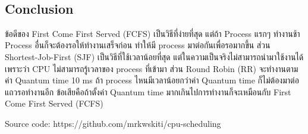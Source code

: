 \documentclass[12pt]{article}
\begin{document}
    \begin{center}
    \end{center}
    { \hspace*{\fill} \\}
    
    \subsection{Conclusion}\label{conclusion}

ข้อดีของ First Come First Served (FCFS) เป็นวิธีที่ง่ายที่สุด แต่ถ้า
Process แรกๆ ทำงานช้า Process อื่นก็จะต้องรอให้ทำงานเสร็จก่อน ทำให้มี
process มาต่อกันเพื่อรอมากขึ้น ส่วน Shortest-Job-First (SJF)
เป็นวิธีที่ใช้เวลาน้อยที่สุด แต่ในความเป็นจริงไม่สามารถนำมาใช้งานได้
เพราะว่า CPU ไม่สามารถรู้เวลาของ process ที่เข้ามา ส่วน Round Robin (RR)
จะทำงานตามค่า Quantum time 10 ms ถ้า process ไหนมีเวลาน้อยกว่าค่า
Quantum time ก็ไม่ต้องมาต่อแถวรอทำงานอีก ข้อเสียคือถ้าตั้งค่า Quantum
time มากเกินไปการทำงานก็จะเหมือนกับ First Come First Served (FCFS)

Source code: https://github.com/mrkwskiti/cpu-scheduling


    
    
    
\end{document}
